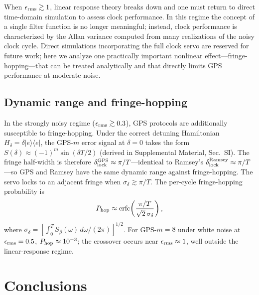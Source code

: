 \documentclass[aps,pra,twocolumn,superscriptaddress,longbibliography]{revtex4-2}
\newcommand{\be}{\begin{equation}}
\newcommand{\ee}{\end{equation}}
\begin{document}
When $\epsilon_{\rm rms} \gtrsim 1$, linear response theory breaks down and one must
return to direct time-domain simulation to assess clock performance.
In this regime the concept of a single filter function is no longer meaningful;
instead, clock performance is characterized by the Allan variance computed from
many realizations of the noisy clock cycle.
Direct simulations incorporating the full clock servo are reserved for future work;
here we analyze one practically important nonlinear effect---fringe-hopping---that
can be treated analytically and that directly limits GPS performance at moderate noise.

\subsection{Dynamic range and fringe-hopping}
\label{sec:fringe_hop}

In the strongly noisy regime ($\epsilon_{\rm rms} \gtrsim 0.3$), GPS protocols are
additionally susceptible to fringe-hopping.
Under the correct detuning Hamiltonian $H_\delta = \delta|e\rangle\langle e|$,
the GPS-$m$ error signal at $\delta=0$ takes the form
$S(\delta) \approx (-1)^m\sin(\delta T/2)$
(derived in Supplemental Material, Sec.~SI).
The fringe half-width is therefore
$\delta_{\rm lock}^{\rm GPS} \approx \pi/T$---identical to Ramsey's
$\delta_{\rm lock}^{\rm Ramsey} \approx \pi/T$---so GPS and Ramsey have
the same dynamic range against fringe-hopping.
The servo locks to an adjacent fringe when $\sigma_\delta \gtrsim \pi/T$.
The per-cycle fringe-hopping probability is
\be
  P_{\rm hop} \approx \mathrm{erfc}\!\left(\frac{\pi/T}{\sqrt{2}\,\sigma_\delta}\right),
  \label{eq:phop}
\ee
where $\sigma_\delta = [\int_0^T S_\beta(\omega)\,d\omega/(2\pi)]^{1/2}$.
For GPS-$m=8$ under white noise at $\epsilon_{\rm rms} = 0.5$,
$P_{\rm hop} \approx 10^{-3}$; the crossover occurs near $\epsilon_{\rm rms} \approx 1$,
well outside the linear-response regime.


\section{Conclusions}
\label{sec:conclusion}
\end{document}
